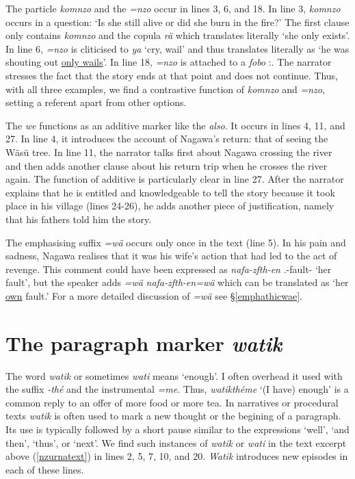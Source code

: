 The particle \emph{komnzo} and the  \emph{=nzo} occur in lines 3, 6, and 18. In line 3, \emph{komnzo} occurs in a question: `Is she still alive or did she burn in the fire?' The first clause only contains \emph{komnzo} and the copula \emph{rä} which translates literally `she only exists'. In line 6, \emph{=nzo} is cliticised to \emph{ya} `cry, wail' and thus translates literally as `he was shouting out \underline{only wails}'. In line 18, \emph{=nzo} is attached to a  \emph{fobo} \Dist:\All{}. The narrator stresses the fact that the story ends at that point and does not continue. Thus, with all three examples, we find a contrastive function of \emph{komnzo} and \emph{=nzo}, setting a referent apart from other options.%

The  \emph{we} functions as an additive marker like the   \emph{also}. It occurs in lines 4, 11, and 27. In line 4, it introduces the account of Nagawa's return: that of seeing the Wäsü tree. In line 11, the narrator talks first about Nagawa crossing the river and then adds another clause about his return trip when he crosses the river again. The function of additive  is particularly clear in line 27. After the narrator explains that he is entitled and knowledgeable to tell the story because it took place in his village (lines 24-26), he adds another piece of justification, namely that his fathers told him the story.%

The emphasising suffix \emph{=wä} occurs only once in the text (line 5). In his pain and sadness, Nagawa realises that it was his wife's action that had led to the act of revenge. This comment could have been expressed as \emph{nafa-zfth-en} \Third.\Poss-fault-\Loc{} `her fault', but the speaker adds \emph{=wä} \emph{nafa-zfth-en=wä} which can be translated as `her \underline{own} fault.' For a more detailed discussion of \emph{=wä} see \S{}\ref{emphathicwae}.

\section{The paragraph marker \emph{watik}} \label{watik}

The word \emph{watik} or sometimes \emph{wati} means `enough'. I often overhead it used with the  suffix \emph{-thé} and the instrumental \emph{=me}. Thus, \emph{watikthéme} `(I have) enough' is a common reply to an offer of more food or more tea. In narratives or procedural texts \emph{watik} is often used to mark a new thought or the begining of a paragraph. Its use is typically followed by a short pause similar to the  expressions `well', `and then', `thus', or `next'. We find such instances of \emph{watik} or \emph{wati} in the text excerpt above (\ref{nzurnatext}) in lines 2, 5, 7, 10, and 20. \emph{Watik} introduces new episodes in each of these lines.

